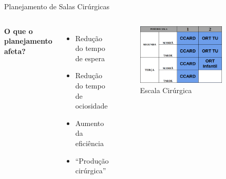 \documentclass[handout]{beamer}
\begin{document}
\begin{frame}{Planejamento de Salas Cirúrgicas}
    \begin{columns}[t]
        \textbf{O que o planejamento afeta?}
        \begin{itemize}
            \setlength\itemsep{1em}
            \item<3-> Redução do tempo de espera
            \item<4-> Redução do tempo de ociosidade
            \item<5-> Aumento da eficiência
            \item<6-> ``Produção cirúrgica''
        \end{itemize}
        \begin{figure}
            \setcounter{figure}{\the\numexpr\value{figure}-1\relax}
            \centering
            \includegraphics[width=0.8\textwidth]{images/schedule.png}
            \caption{Escala Cirúrgica\label{fig:schedule}}
            \setcounter{figure}{\the\numexpr\value{figure}+1\relax}
        \end{figure}
    \end{columns}
\end{frame}
\end{document}
